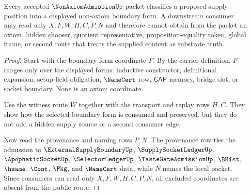 \begin{theorem}
\label{thm:non-axiom-admission-boundary-exhaustion}
Every accepted $\NonAxiomAdmissionUp$ packet classifies a proposed supply position into a displayed non-axiom boundary form. A downstream consumer may read only $X,F,W,H,C,P,N$ and therefore cannot obtain from the packet an axiom, hidden chooser, quotient representative, proposition-equality token, global frame, or second route that treats the supplied content as substrate truth.
\end{theorem}
\begin{proof}
Start with the boundary-form coordinate $F$. By the carrier definition, $F$ ranges only over the displayed forms: inductive constructor, definitional expansion, setup-field obligation, $\NameCert$ row, $\mathsf{GAP}$ memory, bridge slot, or socket boundary. None is an axiom coordinate.

Use the witness route $W$ together with the transport and replay rows $H,C$. They show how the selected boundary form is consumed and preserved, but they do not add a hidden supply source or a second consumer edge.

Now read the provenance and naming rows $P,N$. The provenance row ties the admission to $\ExternalSupplyBoundaryUp$, $\SupplySocketLedgerUp$, $\ApophaticSocketUp$, $\SelectorLedgerUp$, $\TasteGateAdmissionUp$, $\BHist$, $\hsame$, $\Cont$, $\Pkg$, and $\NameCert$ data, while $N$ names the local packet. Since consumers can read only $X,F,W,H,C,P,N$, all excluded coordinates are absent from the public route.
\end{proof}

